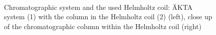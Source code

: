 \begin{figure}[H]
		\centering
          \begin{subfigure}{0.49\textwidth}
                  \flushleft
          \end{subfigure}
        \begin{subfigure}{0.49\textwidth}
                \flushright
        \end{subfigure}
        \\
        \caption[Chromatographic system and the used Helmholtz coil]{Chromatographic system and the used Helmholtz coil: ÄKTA system (1) with the column in the Helmholtz coil (2) (left), close up of the chromatographic column within the Helmholtz coil (right)}
        \label{fig:chrom_sys}
  \end{figure} 

